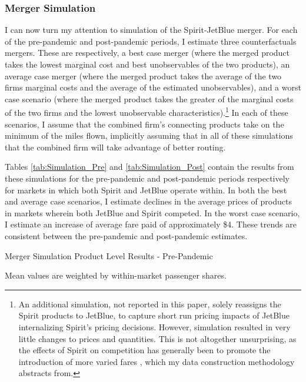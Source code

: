 \documentclass{article}
\begin{document}
	
	\subsubsection{Merger Simulation}
	\label{sec:Analysis_Merger}
	I can now turn my attention to simulation of the Spirit-JetBlue merger. For each of the pre-pandemic and post-pandemic periods, I estimate three counterfactuals mergers. These are respectively, a best case merger (where the merged product takes the lowest marginal cost and best unobservables of the two products), an average case merger (where the merged product takes the average of the two firms marginal costs and the average of the estimated unobservables), and a worst case scenario (where the merged product takes the greater of the marginal costs of the two firms and the lowest unobservable characteristics).\footnote{An additional simulation, not reported in this paper, solely reassigns the Spirit products to JetBlue, to capture short run pricing impacts of JetBlue internalizing Spirit's pricing decisions. However, simulation resulted in very little changes to prices and quantities. This is not altogether unsurprising, as the effects of Spirit on competition has generally been to promote the introduction of more varied fares \citep{shrago_spirit_2024}, which my data construction methodology abstracts from.} In each of these scenarios, I assume that the combined firm's connecting products take on the minimum of the miles flown, implicitly assuming that in all of these simulations that the combined firm will take advantage of better routing. 

     
	 Tables \ref{tab:Simulation_Pre} and \ref{tab:Simulation_Post} contain the results from these simulations for the pre-pandemic and post-pandemic periods respectively for markets in which both Spirit and JetBlue operate within. In both the best and average case scenarios, I estimate declines in the average prices of products in markets wherein both JetBlue and Spirit competed. In the worst case scenario, I estimate an increase of average fare paid of approximately \$4. These trends are consistent between the pre-pandemic and post-pandemic estimates. 


    \begin{table}
        \caption{Merger Simulation Product Level Results - Pre-Pandemic}
        \label{tab:Simulation_Pre}      
        \vspace{-15mm}
        \begin{center} 
        \begin{footnotesize}
                    Mean values are weighted by within-market passenger shares. 
        \end{footnotesize}
        \end{center}
    \end{table}
\end{document}
